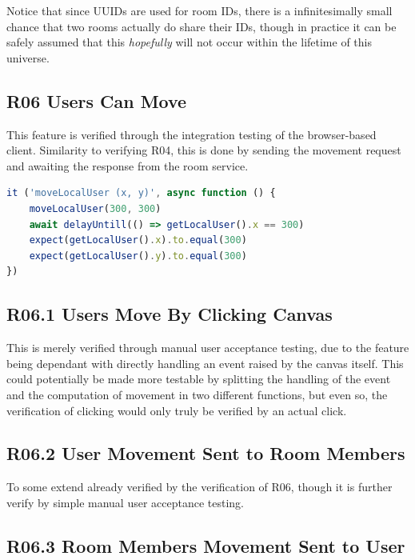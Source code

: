 Notice that since UUIDs are used for room IDs, there is a infinitesimally small chance that two rooms actually do share their IDs, though in practice it can be safely assumed that this \textit{hopefully} will not occur within the lifetime of this universe.

\subsection{R06 Users Can Move}
\label{vR06}

This feature is verified through the integration testing of the browser-based client. Similarity to verifying R04, this is done by sending the movement request and awaiting the response from the room service.

\begin{lstlisting}[language=JavaScript]
it ('moveLocalUser (x, y)', async function () {
    moveLocalUser(300, 300)
    await delayUntill(() => getLocalUser().x == 300)
    expect(getLocalUser().x).to.equal(300)
    expect(getLocalUser().y).to.equal(300)
})
\end{lstlisting}

\subsection{R06.1 Users Move By Clicking Canvas}
\label{vR06.1}

This is merely verified through manual user acceptance testing, due to the feature being dependant with directly handling an event raised by the canvas itself. This could potentially be made more testable by splitting the handling of the event and the computation of movement in two different functions, but even so, the verification of clicking would only truly be verified by an actual click.

\subsection{R06.2 User Movement Sent to Room Members}
\label{vR06.2}

To some extend already verified by the verification of R06, though it is further verify by simple manual user acceptance testing.

\subsection{R06.3 Room Members Movement Sent to User}
\label{vR06.3}

